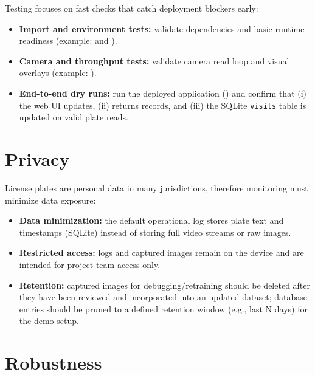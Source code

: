 \noindent
Testing focuses on fast checks that catch deployment blockers early:
\begin{itemize}
	\item \textbf{Import and environment tests:} validate dependencies and basic runtime readiness (example:  and ).
	\item \textbf{Camera and throughput tests:} validate camera read loop and visual overlays (example: ).
	\item \textbf{End-to-end dry runs:} run the deployed application () and confirm that (i) the web UI updates, (ii)  returns records, and (iii) the SQLite \texttt{visits} table is updated on valid plate reads.
\end{itemize}

\section{Privacy}

\noindent
License plates are personal data in many jurisdictions, therefore monitoring must minimize data exposure:
\begin{itemize}
	\item \textbf{Data minimization:} the default operational log stores plate text and timestamps (SQLite) instead of storing full video streams or raw images.
	\item \textbf{Restricted access:} logs and captured images remain on the device and are intended for project team access only.
	\item \textbf{Retention:} captured images for debugging/retraining should be deleted after they have been reviewed and incorporated into an updated dataset; database entries should be pruned to a defined retention window (e.g., last N days) for the demo setup.
\end{itemize}

\section{Robustness}

